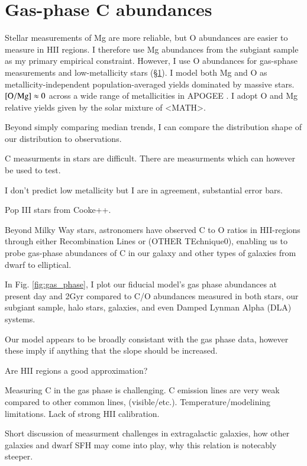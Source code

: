 \documentclass[12pt,oneside]{report}
\begin{document}
\section{Gas-phase C abundances}\label{sec:gas}

Stellar measurements of Mg are more reliable, but O abundances are easier to measure in HII regions. 
I therefore use Mg abundances from the \citet{jack_subgiant} subgiant sample as my primary empirical constraint. However, I use O abundances for gas-sphase measurements and low-metallicity stars (\S \ref{sec:gas}). I model both Mg and O as metallicity-independent population-averaged yields dominated by massive stars. ${\rm [O/Mg]}\approx 0$ across a wide range of metallicities in APOGEE \citep{Weinberg+19, Weinberg+22}. 
I adopt O and Mg relative yields given by the solar mixture of \cite{asplund+09} <MATH>.

Beyond simply comparing median trends, I can compare the distribution 
shape of our distribution to observations. 

C measurments in stars are difficult. There are measurments which can however be used to test. 

I don't predict low metallicity but I are in agreement, substantial error bars.

Pop III stars from Cooke++. 

Beyond Milky Way stars, astronomers have observed C to O ratios in
HII-regions through either Recombination Lines or (OTHER TEchnique0), enabling
us to probe gas-phase abundances of C in our galaxy and other types of
galaxies from dwarf to elliptical. 

In Fig. \ref{fig:gas_phase}, I plot our fiducial model's gas phase abundances
at present day and 2Gyr compared to C/O
abundances measured in both stars, our subgiant sample, halo stars, galaxies,
and even Damped Lynman Alpha (DLA) systems. 

Our model appears to be broadly consistant with the gas phase data, however these imply if anything that the slope should be increased. 

Are HII regions a good approximation?

Measuring C in the gas phase is challenging. C emission lines are
very weak compared to other common lines, (visible/etc.).
Temperature/modelining limitations. Lack of strong HII calibration. 

Short discussion of measurment challenges in extragalactic galaxies, how other galaxies and dwarf SFH may come into play, why this relation is notecably steeper.
\end{document}
